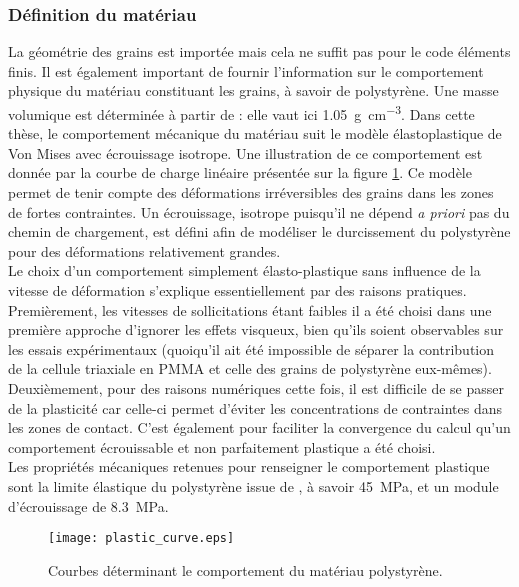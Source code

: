 		\subsubsection{Définition du matériau}
			La géométrie des grains est importée mais cela ne suffit pas pour le code éléments finis. Il est également important de fournir l'information sur le comportement physique du matériau constituant les grains, à savoir de polystyrène. Une masse volumique est déterminée à partir de \citet{wypych_handbook_2016} : elle vaut ici \SI{1.05}{\gram\per\centi\meter\cubed}. Dans cette thèse, le comportement mécanique du matériau suit le modèle élastoplastique de Von Mises avec écrouissage isotrope. Une illustration de ce comportement est donnée par la courbe de charge linéaire présentée sur la figure \ref{fig05:PS_comportement}. Ce modèle permet de tenir compte des déformations irréversibles des grains dans les zones de fortes contraintes. Un écrouissage, isotrope puisqu'il ne dépend \textit{a priori} pas du chemin de chargement, est défini afin de modéliser le durcissement du polystyrène pour des déformations relativement grandes.
			\\Le choix d'un comportement simplement élasto-plastique sans influence de la vitesse de déformation s'explique essentiellement par des raisons pratiques. Premièrement, les vitesses de sollicitations étant faibles il a été choisi dans une première approche d'ignorer les effets visqueux, bien qu'ils soient observables sur les essais expérimentaux (quoiqu'il ait été impossible de séparer la contribution de la cellule triaxiale en PMMA et celle des grains de polystyrène eux-mêmes). Deuxièmement, pour des raisons numériques cette fois, il est difficile de se passer de la plasticité car celle-ci permet d'éviter les concentrations de contraintes dans les zones de contact. C'est également pour faciliter la convergence du calcul qu'un comportement écrouissable et non parfaitement plastique a été choisi.
			\\Les propriétés mécaniques retenues pour renseigner le comportement plastique sont la limite élastique du polystyrène issue de \citet{wypych_handbook_2016}, à savoir \SI{45}{\mega\pascal}, et un module d'écrouissage de \SI{8.3}{\mega\pascal}.
			\begin{figure}\centering
				\texttt{[image: plastic\_curve.eps]}
				\caption{\label{fig05:PS_comportement}Courbes déterminant le comportement du matériau polystyrène.}
			\end{figure}
